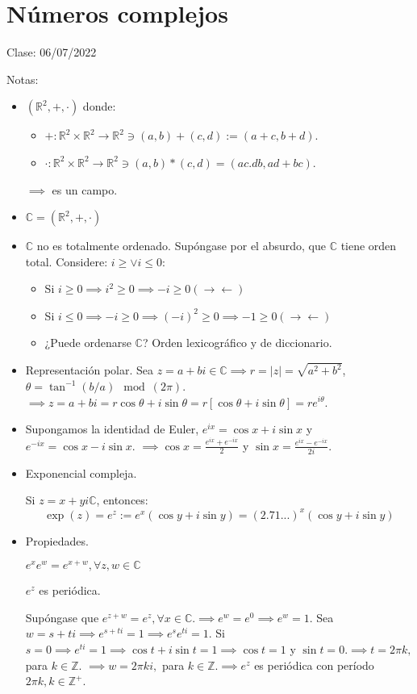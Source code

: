 
\section{Números complejos}

Clase: 06/07/2022

Notas:
\begin{itemize}
    \item $(\mathbb{R}^2,+,\cdot)$ donde:
    \begin{itemize}
        \item $+:\mathbb{R}^2\times \mathbb{R}^2 \to \mathbb{R}^2\ni (a,b)+(c,d):= (a+c,b+d)$.
        \item $\cdot:\mathbb{R}^2\times \mathbb{R}^2 \to \mathbb{R}^2\ni (a,b)*(c,d)= (ac.db,ad+bc)$.
    \end{itemize}
    $\implies$ es un campo.
    \item $\mathbb{C}=(\mathbb{R}^2,+,\cdot)$
    \item $\mathbb{C}$ no es totalmente ordenado. Supóngase por el absurdo, que $\mathbb{C}$ tiene orden total. Considere: $i\geq \vee i\leq 0$:
    \begin{itemize}
        \item Si $i\geq 0 \implies i^2\geq 0 \implies -i\geq 0 (\to\gets)$
        \item Si $i\leq 0\implies -i\geq 0\implies (-i)^2\geq 0\implies -1\geq 0 (\to\gets)$
        \item ¿Puede ordenarse $\mathbb{C}$? Orden lexicográfico y de diccionario.
    \end{itemize}
    \item Representación polar. Sea $z=a+bi\in\mathbb{C}\implies r=|z|=\sqrt{a^2+b^2}$, $\theta =\tan^{-1}(b/a) \mod(2\pi)$. $\implies z=a+bi = r\cos\theta +i\sin \theta=r\left[\cos\theta + i\sin \theta \right]= re^{i\theta}$.
    \item Supongamos la identidad de Euler, $e^{ix}=\cos x+ i \sin x$ y $e^{-ix}=\cos x-i\sin x$. $\implies \cos x =\frac{e^{ix}+e^{-ix}}{2}$ y $ \sin x =\frac{e^{ix}-e^{-ix}}{2i}$.
    \item Exponencial compleja.
    \begin{definicion}
        Si $z=x+yi\mathbb{C}$, entonces: 
    $$\exp(z)=e^z := e^x(\cos y + i\sin y)= (2.71...)^x(\cos y + i\sin y)$$
    \end{definicion}
    \item Propiedades. 
    \begin{prop}
        $e^xe^w=e^{x+w},\forall z,w\in\mathbb{C}$
    \end{prop}
    \begin{prop}
        $e^z$ es periódica.
        \begin{dem}
            Supóngase que $e^{z+w}=e^{z},\forall x\in \mathbb{C}$.$\implies e^w=e^0\implies e^w=1$. Sea $w=s+ti\implies e^{s+ti}=1\implies e^se^{ti}=1$. Si $s=0\implies e^{ti}=1\implies \cos t +i \sin t=1\implies \cos t =1$ y $\sin t=0$.$\implies t=2\pi k,$ para $k\in\mathbb{Z}$. $\implies w= 2\pi k i,$ para $k\in\mathbb{Z}$.$\implies e^z$ es periódica con período $2\pi k,k\in \mathbb{Z}^+$.
        \end{dem}
    \end{prop}
\end{itemize}

